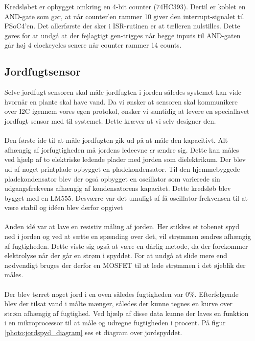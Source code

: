 Kredsløbet er opbygget omkring en 4-bit counter (74HC393). Dertil er koblet en AND-gate som gør, at når counter'en rammer 10 giver den interrupt-signalet til PSoC4'en. Det allerførste der sker i ISR-rutinen er at tælleren nulstilles. Dette gøres for at undgå at der fejlagtigt gen-trigges når begge inputs til AND-gaten går høj 4 clockcycles senere når counter rammer 14 counts. 

\subsection{Jordfugtsensor}
Selve jordfugt sensoren skal måle jordfugten i jorden således systemet kan vide hvornår en plante skal have vand. 
Da vi ønsker at sensoren skal kommunikere over I2C igennem vores egen protokol, ønsker vi samtidig at levere en speciallavet jordfugt sensor med til systemet. Dette kræver at vi selv designer den. 
\\\\
Den første ide til at måle jordfugten gik ud på at måle den kapacitivt.  
Alt afhængig af jorfugtigheden må jordens ledeevne $\epsilon$r ændre sig. Dette kan måles ved hjælp af to elektriske ledende plader med jorden som dielektrikum. Der blev ud af noget printplade opbygget en pladekondensator. Til den hjemmebyggede pladekondensator blev der også opbygget en oscillator som varierede sin udgangsfrekvens afhængig af kondensatorens kapacitet. Dette kredsløb blev bygget med en LM555. Desværre var det umuligt af få oscillator-frekvensen til at være stabil og idéen blev derfor opgivet
\\\\
Anden idé var at lave en resistiv måling af jorden. Her stikkes et tobenet spyd ned i jorden og ved at sætte en spænding over det, vil strømmen ændres afhængig af fugtigheden. Dette viste sig også at være en dårlig metode, da der forekommer elektrolyse når der går en strøm i spyddet. For at undgå at slide mere end nødvendigt bruges der derfor en MOSFET til at lede strømmen i det øjeblik der måles.  
\\\\
Der blev tørret noget jord i en oven således fugtigheden var 0\%. Efterfølgende blev der tilsat vand i målte mænger, således der kunne tegnes en kurve over strøm afhængig af fugtighed. Ved hjælp af disse data kunne der laves en funktion i en mikroprocessor til at måle og udregne fugtigheden i procent. På figur \ref{photo:jordspyd_diagram} ses et diagram over jordspyddet. 

